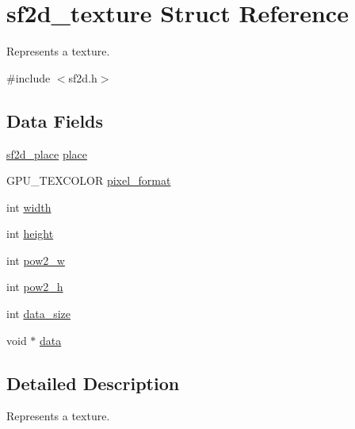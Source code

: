\hypertarget{structsf2d__texture}{\section{sf2d\-\_\-texture Struct Reference}
\label{structsf2d__texture}
}


Represents a texture.  




{\ttfamily \#include $<$sf2d.\-h$>$}

\subsection*{Data Fields}
\begin{DoxyCompactItemize}
\item 
\hyperlink{sf2d_8h_a07951fad547d423a4cf6521c2e5171ea}{sf2d\-\_\-place} \hyperlink{structsf2d__texture_ac30cfc2de337739d1a19858e4fdacaa4}{place}
\item 
G\-P\-U\-\_\-\-T\-E\-X\-C\-O\-L\-O\-R \hyperlink{structsf2d__texture_a247bd65d7ab9db17fdd8bd78b17cba23}{pixel\-\_\-format}
\item 
int \hyperlink{structsf2d__texture_a312abd0ee8ab587825804132c136b253}{width}
\item 
int \hyperlink{structsf2d__texture_a055ccacd41038339dd1ded72747ccf8f}{height}
\item 
int \hyperlink{structsf2d__texture_aa1c5388828ad6d18ea37eb2e6ace7f48}{pow2\-\_\-w}
\item 
int \hyperlink{structsf2d__texture_a644c43b5fde6e12c8f1e3cb0280798e1}{pow2\-\_\-h}
\item 
int \hyperlink{structsf2d__texture_a99107fa90e683bab6456da738ff9d005}{data\-\_\-size}
\item 
void $\ast$ \hyperlink{structsf2d__texture_a46673c7ce439c63554a23e6ce83b254f}{data}
\end{DoxyCompactItemize}


\subsection{Detailed Description}
Represents a texture. 

